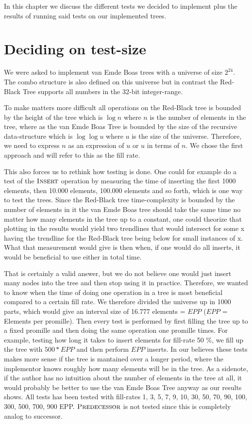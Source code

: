 \documentclass[oneside,11pt,openright]{report}
\newcommand{\Insert}{\textsc{Insert}}
\newcommand{\Predecessor}{\textsc{Predecessor}}
\begin{document}
In this chapter we discuss the different tests we decided to implement plus the results of running said tests on our implemented trees. 

\section{Deciding on test-size}
We were asked to implement van Emde Boas trees with a universe of size $2^{24}$. The combo structure is also defined on this universe but in contrast the Red-Black Tree supports all numbers in the 32-bit integer-range.

To make matters more difficult all operations on the Red-Black tree is bounded by the height of the tree which is $\log n$ where $n$ is the number of elements in the tree, where as the van Emde Boas Tree is bounded by the size of the recursive data-structure which is $\log \log u$ where $u$ is the size of the universe. Therefore, we need to express $n$ as an expression of $u$ or $u$ in terms of $n$. We chose the first approach and will refer to this as the fill rate.

This also forces us to rethink how testing is done. One could for example do a test of the $\Insert$ operation by measuring the time of inserting the first 1000 elements, then 10.000 elements, 100.000 elements and so forth, which is one way to test the trees. Since the Red-Black tree time-complexity is bounded by the number of elements in it the van Emde Boas tree should take the same time no matter how many elements in the tree up to a constant, one could theorize that plotting in the results would yield two trendlines that would intersect for some x having the trendline for the Red-Black tree being below for small instances of x. What that measurement would give is then when, if one would do all inserts, it would be beneficial to use either in total time.

That is certainly a valid answer, but we do not believe one would just insert many nodes into the tree and then stop using it in practice. Therefore, we wanted to know when the time of doing one operation in a tree is most beneficial compared to a certain fill rate. We therefore divided the universe up in 1000 parts, which would give an interval size of 16.777 elements = $EPP$ ($EPP$ = Elements per promille). Then every test is performed by first filling the tree up to a fixed promille and then doing the same operation one promille times. For example, testing how long it takes to insert elements for fill-rate 50 \%, we fill up the tree with $500 * EPP$ and then perform $EPP$ inserts. In our believes these tests makes more sense if the tree is mantained over a longer period, where the implementor knows roughly how many elements will be in the tree. As a sidenote, if the author has no intuition about the number of elements in the tree at all, it would probably be better to use the van Emde Boas Tree anyway as our results shows. All tests has been tested with fill-rates 1, 3, 5, 7, 9, 10, 30, 50, 70, 90, 100, 300, 500, 700, 900 EPP. $\Predecessor$ is not tested since this is completely analog to successor.
\end{document}
